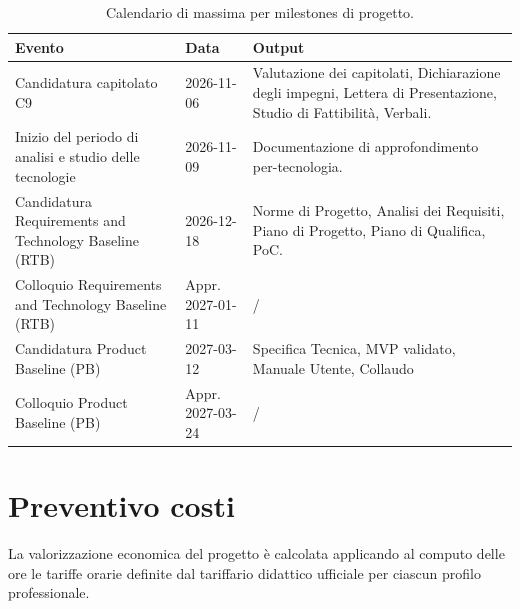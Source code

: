 \documentclass[a4paper, 11pt]{article}
\begin{document}
\begin{table}[h!]
\centering
\begin{tabularx}{\textwidth}{|X|X|X|}
    \hline
    \textbf{Evento} & \textbf{Data} & \textbf{Output} \\ \hline
    Candidatura capitolato C9 & 2026-11-06 & Valutazione dei capitolati, Dichiarazione degli impegni, Lettera di Presentazione, Studio di Fattibilità, Verbali. \\ \hline
    Inizio del periodo di analisi e studio delle tecnologie & 2026-11-09 & Documentazione di approfondimento per-tecnologia. \\ \hline
    Candidatura Requirements and Technology Baseline (RTB) & 2026-12-18 &  Norme di Progetto, Analisi dei Requisiti, Piano di Progetto, Piano di Qualifica, PoC. \\ \hline
    Colloquio Requirements and Technology Baseline (RTB) & Appr. 2027-01-11 & / \\ \hline
    Candidatura Product Baseline (PB) & 2027-03-12 & Specifica Tecnica, MVP validato, Manuale Utente, Collaudo \\ \hline
    Colloquio Product Baseline (PB) & Appr. 2027-03-24 & / \\ \hline
\end{tabularx}
\caption{Calendario di massima per milestones di progetto.}
\end{table}

\newpage

\section{Preventivo costi}
La valorizzazione economica del progetto è calcolata applicando al computo delle ore le tariffe orarie definite dal tariffario didattico ufficiale per ciascun profilo professionale.

\vspace{0.4cm}
\end{document}
